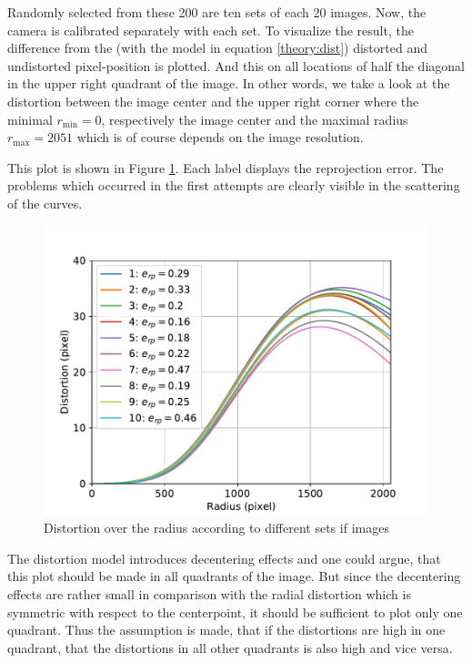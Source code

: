 Randomly selected from these 200 are ten sets of each 20 images.
Now, the camera is calibrated separately with each set.
To visualize the result, the difference from the (with the model in equation \ref{theory:dist}) distorted and undistorted pixel-position is plotted. 
And this on all locations of half the diagonal in the upper right quadrant of the image.
In other words, we take a look at the distortion between the image center and the upper right corner where the minimal $r_{\text{min}}=0$, respectively the image center and the maximal radius $r_{\text{max}}=2051$ which is of course depends on the image resolution.


This plot is shown in Figure \ref{development:stat}.
Each label displays the reprojection error.
The problems which occurred in the first attempts are clearly visible in the scattering of the curves.

\begin{figure}[ht]
	\centering
	\includegraphics[width=0.9\linewidth]{3-development/calibration/images/stat.pdf}
	\caption{Distortion over the radius according to different sets if images\label{development:stat}}
\end{figure}

The distortion model introduces decentering effects and one could argue, that this plot should be made in all quadrants of the image.
But since the decentering effects are rather small in comparison with the radial distortion which is symmetric with respect to the centerpoint, it should be sufficient to plot only one quadrant.
Thus the assumption is made, that if the distortions are high in one quadrant, that the distortions in all other quadrants is also high and vice versa.

